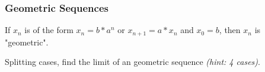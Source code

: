\subsubsection{Geometric Sequences}
\begin{definition}
    If $x_n$ is of the form $x_n = b*a^n$ or $x_{n+1} = a*x_n$ and $x_0 = b$, then $x_n$ is "geometric".
\end{definition}
\begin{question}
    Splitting cases, find the limit of an geometric sequence \textit{(hint: 4 cases)}.
\end{question}
